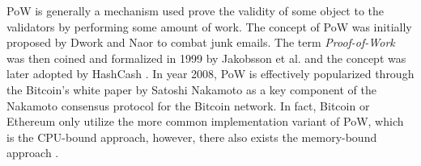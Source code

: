 PoW is generally a mechanism used prove the validity of some object to the validators by performing some amount of work. The concept of PoW was initially proposed by Dwork and Naor \cite{dwork1992pricing} to combat junk emails. The term \textit{Proof-of-Work} was then coined and formalized in 1999 by Jakobsson et al.  \cite{jakobsson1999proofs} and the concept was later adopted by HashCash \cite{back2002hashcash}. In year 2008, PoW is effectively popularized through the Bitcoin's white paper by Satoshi Nakamoto \cite{satoshi2008peer} as a key component of the Nakamoto consensus protocol for the Bitcoin network. In fact, Bitcoin or Ethereum only utilize the more common implementation variant of PoW, which is the CPU-bound approach, however, there also exists the memory-bound approach \cite{dwork2003memory, abadi2005moderately}. 

